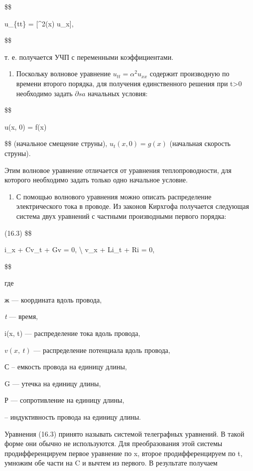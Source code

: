 \documentclass[
  ukrainian,
]{article}
\providecommand{\tightlist}{%
  \setlength{\itemsep}{0pt}\setlength{\parskip}{0pt}}
\begin{document}
\$\$

u\_\{tt\} =  {[}\alpha\^{}2(x) u\_x{]},

\$\$

т. е. получается УЧП с переменными коэффициентами.

\begin{enumerate}
\def\labelenumi{\arabic{enumi}.}
\setcounter{enumi}{2}
\tightlist
\item
  Поскольку волновое уравнение \(u_{tt} = \alpha^2 u_{xx}\) содержит
  производную по времени второго порядка, для получения единственного
  решения при t\textgreater0 необходимо задать \(\partial sa\) начальных
  условия:
\end{enumerate}

\$\$

u(x, 0) = f(x)

\$\$ (начальное смещение струны), \(u_t(x, 0) = g(x)\) (начальная
скорость струны).

Этим волновое уравнение отличается от уравнения теплопроводности, для
которого необходимо задать только одно начальное условие.

\begin{enumerate}
\def\labelenumi{\arabic{enumi}.}
\setcounter{enumi}{3}
\tightlist
\item
  С помощью волнового уравнения можно описать распределение
  электрического тока в проводе. Из законов Кирхгофа получается
  следующая система двух уравнений с частными производными первого
  порядка:
\end{enumerate}

(16.3) \$\$

i\_x + Cv\_t + Gv = 0, \textbackslash{} v\_x + Li\_t + Ri = 0,

\$\$

где

ж --- координата вдоль провода,

\emph{t} --- время,

i(x, t) --- распределение тока вдоль провода,

\(v\left(x,\ t\right)\) --- распределение потенциала вдоль провода,

С -- емкость провода на единицу длины,

G --- утечка на единицу длины,

Р --- сопротивление на единицу длины,

-- индуктивность провода на единицу длины.

Уравнения (16.3) принято называть системой телеграфных уравнений. В
такой форме они обычно не используются. Для преобразования этой системы
продифференцируем первое уравнение по x, второе продифференцируем по t,
умножим обе части на C и вычтем из первого. В результате получаем
\end{document}
